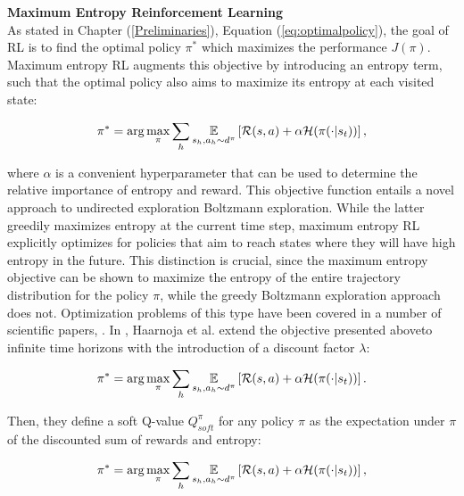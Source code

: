 \textbf{Maximum Entropy Reinforcement Learning} \\
As stated in Chapter (\ref{Preliminaries}), Equation (\ref{eq:optimalpolicy}), the goal of \gls{RL} is to find the optimal policy $\pi^*$ which maximizes the performance $J(\pi)$. Maximum entropy \gls{RL} augments this objective by introducing an entropy term, such that the optimal policy also aims to maximize its entropy at each visited state:

\begin{align}
\pi^*=\arg\max_\pi\sum_h\underset{s_h,a_h\sim d^{\pi}}{\mathbb{E}}\left[{\mathcal{R}(s,a)+\alpha\mathcal{H}(\pi(\cdot|s_t))}\right],
\end{align}

where $\alpha$ is a convenient hyperparameter that can be used to determine the relative importance of entropy and reward. This objective function entails a novel approach to undirected exploration \wrt Boltzmann  exploration. While the latter greedily maximizes entropy at the current time step, maximum entropy \gls{RL} explicitly optimizes for policies that aim to reach states where they will have high entropy in the future. This
distinction is crucial, since the maximum entropy objective can be shown to maximize the entropy of the entire trajectory distribution for the policy $\pi$, while the greedy Boltzmann exploration approach does not. Optimization problems of this type have been covered in a number of scientific papers, \eg \cite{kappen2005path, ziebart2008maximum, haarnoja2017reinforcement}. In \cite{haarnoja2017reinforcement},  Haarnoja et al. extend the objective presented aboveto infinite time horizons with the introduction of a discount factor $\lambda$:

\begin{align}
\pi^*=\arg\max_\pi\sum_h\underset{s_h,a_h\sim d^{\pi}}{\mathbb{E}}\left[{\mathcal{R}(s,a)+\alpha\mathcal{H}(\pi(\cdot|s_t))}\right].
\end{align}

Then, they define a soft Q-value $Q_{soft}^{\pi}$ for any policy $\pi$ as the expectation under $\pi$ of the discounted sum of rewards and entropy:

\begin{align}
\pi^*=\arg\max_\pi\sum_h\underset{s_h,a_h\sim d^{\pi}}{\mathbb{E}}\left[{\mathcal{R}(s,a)+\alpha\mathcal{H}(\pi(\cdot|s_t))}\right],
\end{align}

